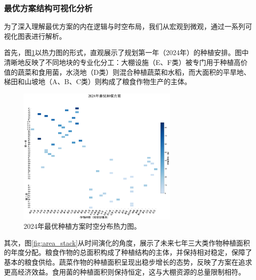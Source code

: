 \subsubsection{最优方案结构可视化分析}
为了深入理解最优方案的内在逻辑与时空布局，我们从宏观到微观，通过一系列可视化图表进行解析。

首先，图\ref{fig:optimal_solution_2024}以热力图的形式，直观展示了规划第一年（2024年）的种植安排。图中清晰地反映了不同地块的专业化分工：大棚设施（E、F类）被专门用于种植高价值的蔬菜和食用菌，水浇地（D类）则混合种植蔬菜和水稻，而大面积的平旱地、梯田和山坡地（A、B、C类）则构成了粮食作物生产的主体。

\begin{figure}[H]
    \centering
    \includegraphics[width=0.7\textwidth]{figs/5问题三/2024年最优种植方案.png}
    \caption{2024年最优种植方案时空分布热力图。}
    \label{fig:optimal_solution_2024}
\end{figure}

其次，图\ref{fig:area_stack}从时间演化的角度，展示了未来七年三大类作物种植面积的年度分配。粮食作物的总面积构成了种植结构的主体，并保持相对稳定，保障了基本的粮食供给。蔬菜作物的种植面积呈现出稳步增长的态势，反映了方案在追求更高经济效益。食用菌的种植面积则保持恒定，这与大棚资源的总量限制相符。

